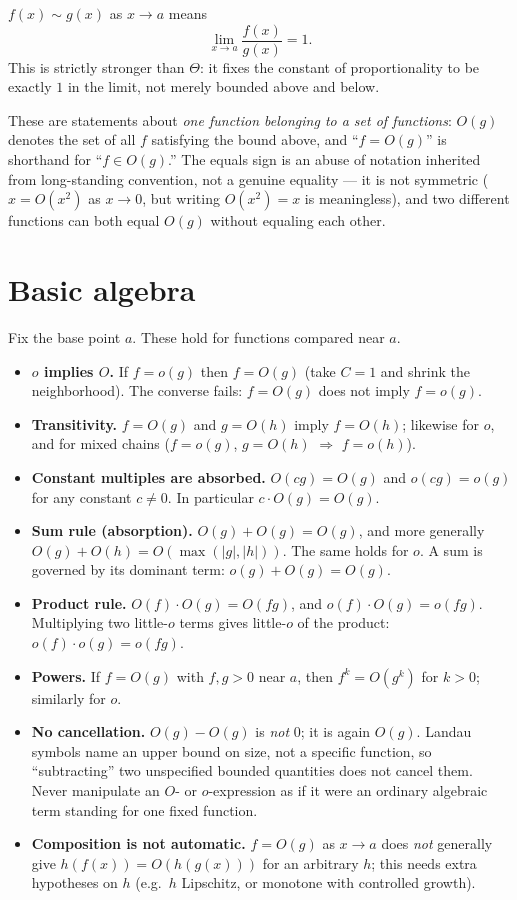 \documentclass{essay}
\begin{document}
\begin{definition}
$f(x) \sim g(x)$ as $x\to a$ means
\[
  \lim_{x\to a} \frac{f(x)}{g(x)} = 1.
\]
This is strictly stronger than $\Theta$: it fixes the constant of proportionality to be exactly $1$ in the limit, not merely bounded above and below.
\end{definition}

\begin{remark}
These are statements about \emph{one function belonging to a set of functions}: $O(g)$ denotes the set of all $f$ satisfying the bound above, and ``$f=O(g)$'' is shorthand for ``$f\in O(g)$.'' The equals sign is an abuse of notation inherited from long-standing convention, not a genuine equality --- it is not symmetric ($x=O(x^2)$ as $x\to 0$, but writing $O(x^2)=x$ is meaningless), and two different functions can both equal $O(g)$ without equaling each other.
\end{remark}

\section{Basic algebra}

Fix the base point $a$. These hold for functions compared near $a$.

\begin{itemize}
  \item \textbf{$o$ implies $O$.} If $f=o(g)$ then $f=O(g)$ (take $C=1$ and shrink the neighborhood). The converse fails: $f=O(g)$ does not imply $f=o(g)$.
  \item \textbf{Transitivity.} $f=O(g)$ and $g=O(h)$ imply $f=O(h)$; likewise for $o$, and for mixed chains ($f=o(g)$, $g=O(h)$ $\Rightarrow$ $f=o(h)$).
  \item \textbf{Constant multiples are absorbed.} $O(cg)=O(g)$ and $o(cg)=o(g)$ for any constant $c\neq 0$. In particular $c\cdot O(g) = O(g)$.
  \item \textbf{Sum rule (absorption).} $O(g)+O(g)=O(g)$, and more generally $O(g)+O(h) = O(\max(|g|,|h|))$. The same holds for $o$. A sum is governed by its dominant term: $o(g)+O(g)=O(g)$.
  \item \textbf{Product rule.} $O(f)\cdot O(g) = O(fg)$, and $o(f)\cdot O(g) = o(fg)$. Multiplying two little-$o$ terms gives little-$o$ of the product: $o(f)\cdot o(g) = o(fg)$.
  \item \textbf{Powers.} If $f=O(g)$ with $f,g>0$ near $a$, then $f^k = O(g^k)$ for $k>0$; similarly for $o$.
  \item \textbf{No cancellation.} $O(g)-O(g)$ is \emph{not} $0$; it is again $O(g)$. Landau symbols name an upper bound on size, not a specific function, so ``subtracting'' two unspecified bounded quantities does not cancel them. Never manipulate an $O$- or $o$-expression as if it were an ordinary algebraic term standing for one fixed function.
  \item \textbf{Composition is not automatic.} $f=O(g)$ as $x\to a$ does \emph{not} generally give $h(f(x)) = O(h(g(x)))$ for an arbitrary $h$; this needs extra hypotheses on $h$ (e.g.\ $h$ Lipschitz, or monotone with controlled growth).
\end{itemize}
\end{document}
